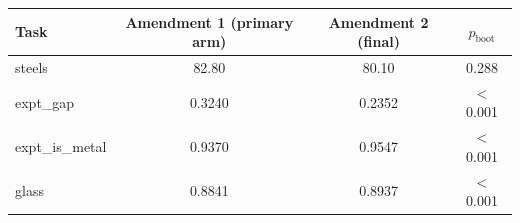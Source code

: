 \begin{tabular}{lccc}
\toprule
Task & Amendment 1 (primary arm) & Amendment 2 (final) & $p_\mathrm{boot}$ \\
\midrule
steels & 82.80 & 80.10 & 0.288 \\
expt\_gap & 0.3240 & 0.2352 & $<$0.001 \\
expt\_is\_metal & 0.9370 & 0.9547 & $<$0.001 \\
glass & 0.8841 & 0.8937 & $<$0.001 \\
\bottomrule
\end{tabular}
